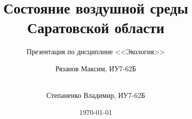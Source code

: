 
\title{Состояние воздушной среды \\ Саратовской области}
\subtitle{Презентация по дисциплине <<Экология>>}
\author{Рязанов Максим, ИУ7-62Б \and\\ Степаненко Владимир, ИУ7-62Б}
\date{\today}



\begin{frame}
  \maketitle
\end{frame}




